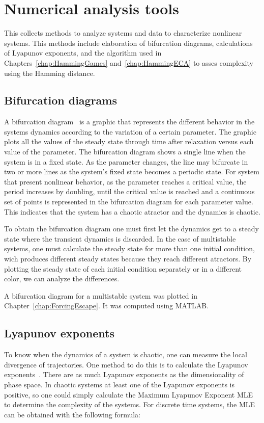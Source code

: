 \section{Numerical analysis tools}

This collects methods to analyze systems and data to characterize nonlinear systems. This methods include elaboration of bifurcation diagrams, calculations of Lyapunov exponents, and the algorithm used in Chapters~\ref{chap:HammingGames} and~\ref{chap:HammingECA} to asses complexity using the Hamming distance.

\subsection{Bifurcation diagrams}

A bifurcation diagram~\cite{Bifurcation} is a graphic that represents the different behavior in the systems dynamics according to the variation of a certain parameter. The graphic plots all the values of the steady state through time after relaxation versus each value of the parameter. The bifurcation diagram shows a single line when the system is in a fixed state. As the parameter changes, the line may bifurcate in two or more lines as the system's fixed state becomes a periodic state. For system that present nonlinear behavior, as the parameter reaches a critical value, the period increases by doubling, until the critical value is reached and a continuous set of points is represented in the bifurcation diagram for each parameter value. This indicates that the system has a chaotic atractor and the dynamics is chaotic.

To obtain the bifurcation diagram one must first let the dynamics get to a steady state where the transient dynamics is discarded. In the case of multistable systems, one must calculate the steady state for more than one initial condition, wich produces different steady states because they reach different atractors. By plotting the steady state of each initial condition separately or in a different color, we can analyze the differences. 

A bifurcation diagram for a multistable system was plotted in Chapter~\ref{chap:ForcingEscape}. It was computed using MATLAB. 

\subsection{Lyapunov exponents}

To know when the dynamics of a system is chaotic, one can measure the local divergence of trajectories. One method to do this is to calculate the Lyapunov exponents~\cite{LyaExp}. There are as much Lyapunov exponents as the dimensionality of phase space. In chaotic systems at least one of the Lyapunov exponents is positive, so one could simply calculate the Maximum Lyapunov Exponent MLE to determine the complexity of the systems. For discrete time systems, the MLE can be obtained with the following formula:

